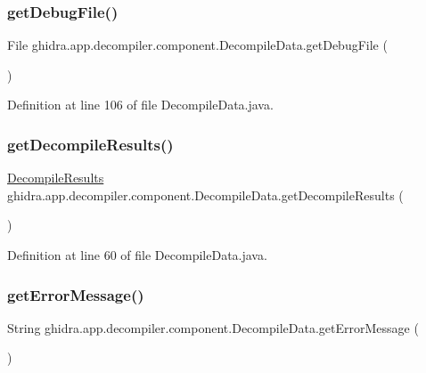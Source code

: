 \subsubsection{\texorpdfstring{getDebugFile()}{getDebugFile()}}
{\footnotesize\ttfamily File ghidra.\+app.\+decompiler.\+component.\+Decompile\+Data.\+get\+Debug\+File (\begin{DoxyParamCaption}{ }\end{DoxyParamCaption})\hspace{0.3cm}{\ttfamily [inline]}}



Definition at line 106 of file Decompile\+Data.\+java.

\mbox{\label{classghidra_1_1app_1_1decompiler_1_1component_1_1_decompile_data_a1c05130998f0fdd4e0b3425c0e65c32d}} 
\subsubsection{\texorpdfstring{getDecompileResults()}{getDecompileResults()}}
{\footnotesize\ttfamily \mbox{\hyperlink{classghidra_1_1app_1_1decompiler_1_1_decompile_results}{Decompile\+Results}} ghidra.\+app.\+decompiler.\+component.\+Decompile\+Data.\+get\+Decompile\+Results (\begin{DoxyParamCaption}{ }\end{DoxyParamCaption})\hspace{0.3cm}{\ttfamily [inline]}}



Definition at line 60 of file Decompile\+Data.\+java.

\mbox{\label{classghidra_1_1app_1_1decompiler_1_1component_1_1_decompile_data_a4aeb6c97052990e46d6fbe2ed6794a57}} 
\subsubsection{\texorpdfstring{getErrorMessage()}{getErrorMessage()}}
{\footnotesize\ttfamily String ghidra.\+app.\+decompiler.\+component.\+Decompile\+Data.\+get\+Error\+Message (\begin{DoxyParamCaption}{ }\end{DoxyParamCaption})\hspace{0.3cm}{\ttfamily [inline]}}



